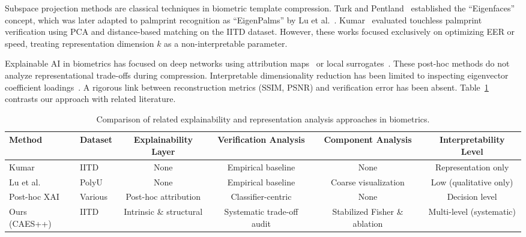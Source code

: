 \documentclass[conference]{IEEEtran}
\begin{document}
Subspace projection methods are classical techniques in biometric template compression. Turk and Pentland~\cite{turk1991eigenfaces} established the ``Eigenfaces'' concept, which was later adapted to palmprint recognition as ``EigenPalms'' by Lu et al.~\cite{lu2003palmprint}. Kumar~\cite{kumar2008incorporating} evaluated touchless palmprint verification using PCA and distance-based matching on the IITD dataset. However, these works focused exclusively on optimizing EER or speed, treating representation dimension $k$ as a non-interpretable parameter.

Explainable AI in biometrics has focused on deep networks using attribution maps~\cite{selvaraju2017gradcam} or local surrogates~\cite{ribeiro2016lime}. These post-hoc methods do not analyze representational trade-offs during compression. Interpretable dimensionality reduction has been limited to inspecting eigenvector coefficient loadings~\cite{jolliffe2002pca}. A rigorous link between reconstruction metrics (SSIM, PSNR) and verification error has been absent. Table~\ref{tab:comparison} contrasts our approach with related literature.

\begin{table}[t]
\centering
\caption{Comparison of related explainability and representation analysis approaches in biometrics.}
\label{tab:comparison}
\begin{tabular}{@{}llcccc@{}}
\toprule
\textbf{Method} & \textbf{Dataset} & \textbf{Explainability Layer} & \textbf{Verification Analysis} & \textbf{Component Analysis} & \textbf{Interpretability Level} \\
\midrule
Kumar~\cite{kumar2008incorporating} & IITD & None & Empirical baseline & None & Representation only \\
Lu et al.~\cite{lu2003palmprint} & PolyU & None & Empirical baseline & Coarse visualization & Low (qualitative only) \\
Post-hoc XAI~\cite{selvaraju2017gradcam, lundberg2017shap} & Various & Post-hoc attribution & Classifier-centric & None & Decision level \\
Ours (CAES++) & IITD & Intrinsic \& structural & Systematic trade-off audit & Stabilized Fisher \& ablation & Multi-level (systematic) \\
\bottomrule
\end{tabular}
\end{table}

\end{document}
